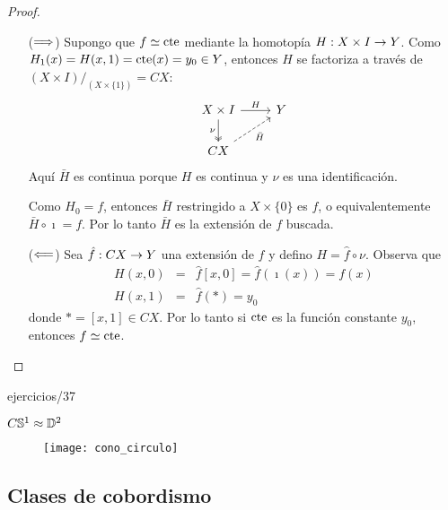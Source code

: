 \documentclass[../../topologia_algebraica]{subfiles}
\begin{document}
\begin{proof}
\begin{enumerate}
  \item[($\Longrightarrow$)]
    Supongo que $f\simeq\text{cte}$ mediante la homotop\'ia $H:X\times I\rightarrow Y$. Como
    $H_1(x)=H(x,1)=\text{cte}(x)=y_0\in Y$,
    entonces $H$ se factoriza a trav\'es de $(X\times I)/_{(X\times\{1\})}=CX$:
    \[
      \begin{tikzcd}
        X\times I \arrow[r,"H"] \arrow[d,two heads,"\nu"'] & Y \\
        CX \arrow[ur,dashed,"\bar{H}"'] &
      \end{tikzcd}
    \]
    Aqu\'i $\bar{H}$ es continua porque $H$ es continua y $\nu$ es una identificaci\'on.
  
    Como $H_0=f$, entonces $\bar{H}$ restringido a $X\times\{0\}$ es $f$, o equivalentemente
    $\bar{H}\circ\imath=f$. Por lo tanto $\bar{H}$ es la extensi\'on de $f$ buscada.
  \item[($\Longleftarrow$)] Sea $\hat{f}:CX\rightarrow Y$ una extensi\'on de $f$ y defino $H=\hat{f}\circ\nu$.
    Observa que
    \begin{eqnarray*}
      H(x,0)&=&\hat{f}[x,0]=\hat{f}(\imath(x))=f(x) \\
      H(x,1)&=&\hat{f}(*)=y_0
    \end{eqnarray*}
    donde $*=[x,1]\in CX$. Por lo tanto si $\text{cte}$ es la funci\'on constante $y_0$, entonces
    $f\simeq \text{cte}$.
\end{enumerate}
\end{proof}

{ejercicios/37} %

\begin{ejemplo}
  $C\mathbb{S}^1\approx\mathbb{D}^2$
\begin{figure}[h] %
    \centering\label{fig:cono_circulo}
    \texttt{[image: cono\_circulo]}
\end{figure}%
\end{ejemplo}

\subsection{Clases de cobordismo}
\end{document}
